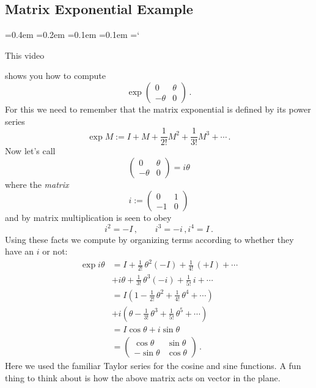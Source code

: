 
\subsection*{Matrix Exponential Example}

{\ttfamily
{}\font=0.4em
\font=0.2em
\font=0.1em
\font=0.1em
\hyphenchar\font=`\-

\hypertarget{properties_of_matrices_example}{This video} shows you
how to compute
\[
\exp\begin{pmatrix}0&\theta\\-\theta & 0\end{pmatrix}
\, .
\]
For this we need to remember that the matrix exponential is defined by its power series
\[
\exp M := I + M + \frac1{2!} M^2 + \frac1{3!} M^3+\cdots\, .
\]
Now let's call 
\[\begin{pmatrix}0&\theta\\-\theta & 0\end{pmatrix}=i\theta\]
where the {\itshape matrix} 
\[
i:=\begin{pmatrix}0&1\\-1 & 0\end{pmatrix}
\]
and by matrix multiplication is seen to obey
\[
i^2 =-I\, ,\qquad i^3=-i\, , i^4 = I\, .
\]
Using these facts we compute by organizing terms according to whether they have an $i$ or not:
\begin{align*}
\exp i\theta
&= I + \frac 1{2!}\, \theta^2 (-I) + \frac 1{4!} \,(+I) + \cdots \\
&+i \theta + \frac1{3!} \,\theta^3 (-i) + \frac 1{5!} \,i+\cdots\\[2mm]
&= I ( 1-\frac 1{2!}\, \theta^2  + \frac 1{4!}\,\theta^4  + \cdots)\\
&+i( \theta- \frac1{3!}\, \theta^3  + \frac 1{5!}\,\theta^5 +\cdots)\\[2mm]
&=I\cos\theta + i \sin\theta \\[2mm]
&=\begin{pmatrix}\cos\theta & \sin\theta \\ -\sin\theta & \cos\theta\end{pmatrix}\, .
\end{align*}
Here we used the familiar Taylor series for the cosine and sine functions. A fun thing to think about is how the above matrix
acts on vector in the plane.


} %

